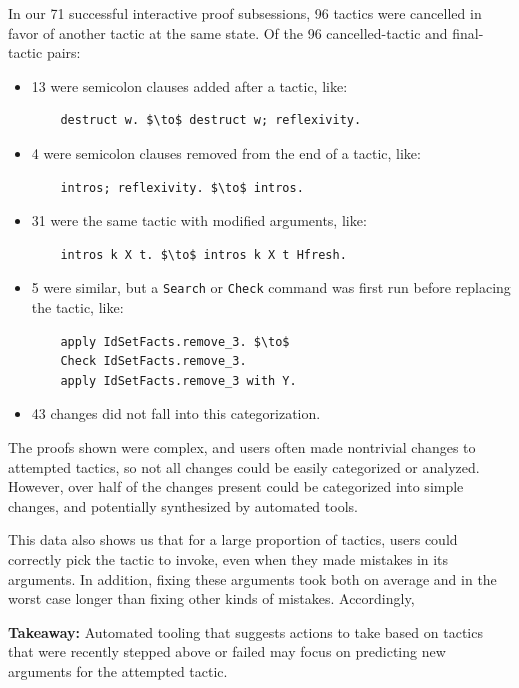 In our 71 successful interactive proof subsessions, 96 tactics
were cancelled in favor of another tactic at the same state.
Of the 96 cancelled-tactic and final-tactic pairs: %
\begin{itemize}
\item 13 were semicolon clauses added after a tactic, like:
  \begin{lstlisting}
    destruct w. $\to$ destruct w; reflexivity.
  \end{lstlisting}
\item 4 were semicolon clauses removed from the end of a tactic, like:
  \begin{lstlisting}
    intros; reflexivity. $\to$ intros.
  \end{lstlisting}
\item 31 were the same tactic with modified arguments, like:
  \begin{lstlisting}
    intros k X t. $\to$ intros k X t Hfresh.
  \end{lstlisting}
\item 5 were similar, but a \lstinline{Search} or \lstinline{Check} command was first run
  before replacing the tactic, like:
  \begin{lstlisting}
    apply IdSetFacts.remove_3. $\to$ 
    Check IdSetFacts.remove_3. 
    apply IdSetFacts.remove_3 with Y.
  \end{lstlisting}
\item 43 changes did not fall into this categorization.
\end{itemize}

The proofs shown were complex, and users often made nontrivial
changes to attempted tactics, so not all changes could be
easily categorized or analyzed. However, over half of the changes
present could be categorized into simple changes, and potentially
synthesized by automated tools.

This data also shows us that for a large proportion of tactics, users
could correctly pick the tactic to invoke, even when they made
mistakes in its arguments. In addition, fixing these arguments took both
on average and in the worst case longer than fixing other kinds
of mistakes. Accordingly,
\begin{displayquote}
  \textbf{Takeaway:}
  Automated tooling that suggests actions to take
  based on tactics that were recently stepped above or failed
  may focus on predicting new arguments for the attempted tactic.
\end{displayquote}

